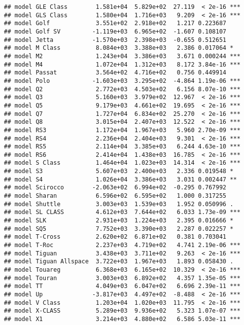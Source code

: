 \documentclass[
]{article}
\begin{document}
\begin{verbatim}
## model GLE Class        1.581e+04  5.829e+02  27.119  < 2e-16 ***
## model GLS Class        1.580e+04  1.716e+03   9.209  < 2e-16 ***
## model Golf             3.551e+02  2.918e+02   1.217 0.223687    
## model Golf SV         -1.119e+03  6.965e+02  -1.607 0.108107    
## model Jetta           -1.570e+03  2.398e+03  -0.655 0.512651    
## model M Class          8.084e+03  3.388e+03   2.386 0.017064 *  
## model M2               1.243e+04  3.386e+03   3.671 0.000244 ***
## model M4               1.072e+04  1.312e+03   8.172 3.84e-16 ***
## model Passat           3.564e+02  4.716e+02   0.756 0.449914    
## model Polo            -1.603e+03  3.295e+02  -4.864 1.19e-06 ***
## model Q2               2.772e+03  4.503e+02   6.156 8.07e-10 ***
## model Q3               5.160e+03  3.979e+02  12.967  < 2e-16 ***
## model Q5               9.179e+03  4.661e+02  19.695  < 2e-16 ***
## model Q7               1.727e+04  6.834e+02  25.270  < 2e-16 ***
## model Q8               3.015e+04  2.407e+03  12.522  < 2e-16 ***
## model RS3              1.172e+04  1.967e+03   5.960 2.70e-09 ***
## model RS4              2.236e+04  2.404e+03   9.301  < 2e-16 ***
## model RS5              2.114e+04  3.385e+03   6.244 4.63e-10 ***
## model RS6              2.414e+04  1.438e+03  16.785  < 2e-16 ***
## model S Class          1.464e+04  1.023e+03  14.314  < 2e-16 ***
## model S3               5.607e+03  2.400e+03   2.336 0.019548 *  
## model S4               1.026e+04  3.386e+03   3.031 0.002447 ** 
## model Scirocco        -2.063e+02  6.994e+02  -0.295 0.767992    
## model Sharan           6.596e+02  6.595e+02   1.000 0.317255    
## model Shuttle          3.003e+03  1.539e+03   1.952 0.050996 .  
## model SL CLASS         4.612e+03  7.644e+02   6.033 1.73e-09 ***
## model SLK              2.931e+03  1.224e+03   2.395 0.016666 *  
## model SQ5              7.752e+03  3.390e+03   2.287 0.022257 *  
## model T-Cross          2.620e+02  6.871e+02   0.381 0.703041    
## model T-Roc            2.237e+03  4.719e+02   4.741 2.19e-06 ***
## model Tiguan           3.438e+03  3.711e+02   9.263  < 2e-16 ***
## model Tiguan Allspace  3.722e+03  1.967e+03   1.893 0.058430 .  
## model Touareg          6.368e+03  6.165e+02  10.329  < 2e-16 ***
## model Touran           3.003e+03  6.892e+02   4.357 1.35e-05 ***
## model TT               4.049e+03  6.047e+02   6.696 2.39e-11 ***
## model Up              -3.817e+03  4.497e+02  -8.488  < 2e-16 ***
## model V Class          1.203e+04  1.020e+03  11.795  < 2e-16 ***
## model X-CLASS          5.289e+03  9.936e+02   5.323 1.07e-07 ***
## model X1               3.214e+03  4.880e+02   6.586 5.03e-11 ***

\end{verbatim}
\end{document}

